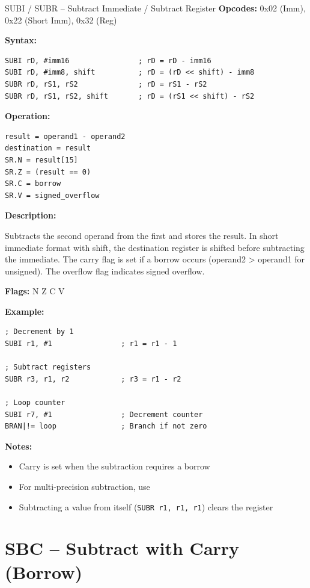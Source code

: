 \begin{instructionbox}{SUBI / SUBR -- Subtract Immediate / Subtract Register}
	\textbf{Opcodes:} 0x02 (Imm), 0x22 (Short Imm), 0x32 (Reg)

	\textbf{Syntax:}
	\begin{lstlisting}
SUBI rD, #imm16                ; rD = rD - imm16
SUBI rD, #imm8, shift          ; rD = (rD << shift) - imm8
SUBR rD, rS1, rS2              ; rD = rS1 - rS2
SUBR rD, rS1, rS2, shift       ; rD = (rS1 << shift) - rS2
\end{lstlisting}

	\textbf{Operation:}
	\begin{verbatim}
result = operand1 - operand2
destination = result
SR.N = result[15]
SR.Z = (result == 0)
SR.C = borrow
SR.V = signed_overflow
\end{verbatim}

	\textbf{Description:}

	Subtracts the second operand from the first and stores the result. In short immediate format with shift, the
	destination register is shifted before subtracting the immediate. The carry flag is set if a borrow occurs
	(operand2 > operand1 for unsigned). The overflow flag indicates signed overflow.

	\textbf{Flags:} N Z C V

	\textbf{Example:}
	\begin{lstlisting}
; Decrement by 1
SUBI r1, #1                ; r1 = r1 - 1

; Subtract registers
SUBR r3, r1, r2            ; r3 = r1 - r2

; Loop counter
SUBI r7, #1                ; Decrement counter
BRAN|!= loop               ; Branch if not zero
\end{lstlisting}

	\textbf{Notes:}
	\begin{itemize}
		\item Carry is set when the subtraction requires a borrow
		\item For multi-precision subtraction, use 
		\item Subtracting a value from itself (\texttt{SUBR r1, r1, r1}) clears the register
	\end{itemize}
\end{instructionbox}

\section{SBC -- Subtract with Carry (Borrow)}

